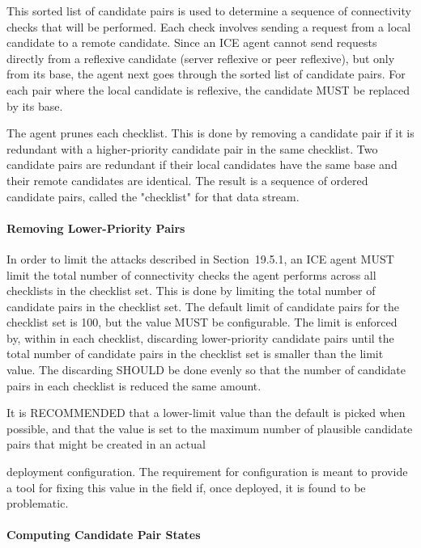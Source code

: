 \documentclass{article}
\begin{document}
This sorted list of candidate pairs is used to determine a sequence of connectivity checks that will be performed.  Each check involves sending a request from a local candidate to a remote candidate. Since an ICE agent cannot send requests directly from a reflexive candidate (server reflexive or peer reflexive), but only from its base, the agent next goes through the sorted list of candidate pairs. For each pair where the local candidate is reflexive, the candidate MUST be replaced by its base.

The agent prunes each checklist.  This is done by removing a candidate pair if it is redundant with a higher-priority candidate pair in the same checklist.  Two candidate pairs are redundant if their local candidates have the same base and their remote candidates are identical.  The result is a sequence of ordered candidate pairs, called the "checklist" for that data stream.

\paragraph{Removing Lower-Priority Pairs}

In order to limit the attacks described in Section~19.5.1, an ICE agent MUST limit the total number of connectivity checks the agent performs across all checklists in the checklist set.  This is done by limiting the total number of candidate pairs in the checklist set. The default limit of candidate pairs for the checklist set is 100, but the value MUST be configurable.  The limit is enforced by, within in each checklist, discarding lower-priority candidate pairs until the total number of candidate pairs in the checklist set is smaller than the limit value.  The discarding SHOULD be done evenly so that the number of candidate pairs in each checklist is reduced the same amount.

It is RECOMMENDED that a lower-limit value than the default is picked when possible, and that the value is set to the maximum number of plausible candidate pairs that might be created in an actual

deployment configuration.  The requirement for configuration is meant to provide a tool for fixing this value in the field if, once deployed, it is found to be problematic.

\paragraph{Computing Candidate Pair States}
\end{document}
